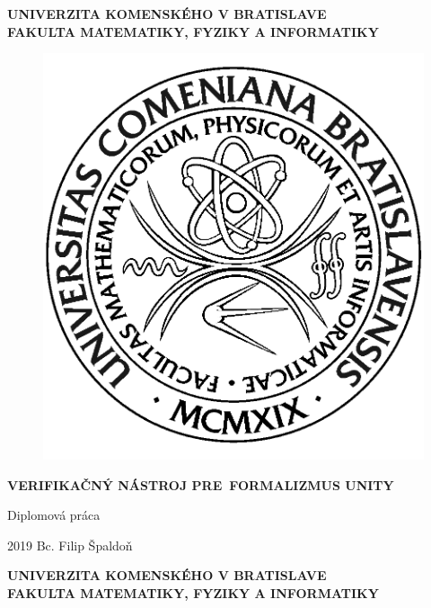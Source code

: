 \documentclass[12pt, a4paper, oneside]{book}
\newcommand\mftitle{Verifikačný nástroj pre formalizmus UNITY}
\newcommand\mfthesistype{Diplomová práca}
\newcommand\mfauthor{Bc. Filip Špaldoň}
\newcommand\mfuniversity{UNIVERZITA KOMENSKÉHO V BRATISLAVE}
\newcommand\mffaculty{FAKULTA MATEMATIKY, FYZIKY A INFORMATIKY}
\begin{document}
\frontmatter

\thispagestyle{empty}

\noindent
\begin{minipage}{\textwidth}
\begin{center}
\textbf{\mfuniversity \\
\mffaculty}
\end{center}
\end{minipage}

\vfill
\begin{figure}[!hbt]
	\begin{center}
		\includegraphics{images/logo_fmph}
		\label{img:logo}
	\end{center}
\end{figure}
\begin{center}
	\begin{minipage}{0.8\textwidth}
		\centerline{\textbf{\Large\MakeUppercase{\mftitle}}}
		\smallskip
		\centerline{\mfthesistype}
	\end{minipage}
\end{center}
\vfill
2019 \hfill
\mfauthor
\eject 

\thispagestyle{empty}

\noindent
\begin{minipage}{\textwidth}
\begin{center}
\textbf{\mfuniversity \\
\mffaculty}
\end{center}
\end{minipage}
\end{document}
